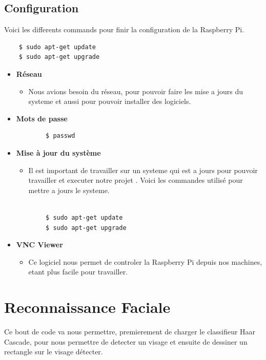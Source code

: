 \documentclass{article}
\begin{document}
\subsection{Configuration}
Voici les differents commands pour finir la configuration de la Raspberry Pi.
\begin{verbatim}
    $ sudo apt-get update
    $ sudo apt-get upgrade
\end{verbatim}
\begin{itemize}
    \item \textbf{Réseau}
    \begin{itemize}
        \item Nous avions besoin du réseau, pour pouvoir faire les mise a jours du systeme et aussi pour pouvoir installer des logiciels.
    \end{itemize}
    \item \textbf{Mots de passe}
    \begin{verbatim}
        $ passwd
    \end{verbatim}
    \item \textbf{Mise à jour du système}
    \begin{itemize}
        \item Il est important de travailler sur un systeme qui est a jours pour pouvoir travailler et executer notre projet
        . Voici les commandes utilisé pour mettre a jours le systeme.
    \end{itemize}
    \begin{verbatim}
        
        $ sudo apt-get update
        $ sudo apt-get upgrade
    \end{verbatim}
    
    \item \textbf{VNC Viewer}
    \begin{itemize}
        \item Ce logiciel nous permet de controler la Raspberry Pi depuis nos machines, etant plus facile pour travailler.
    \end{itemize}
\end{itemize}

\section{Reconnaissance Faciale}

Ce bout de code va nous permettre, premierement de charger le classifieur Haar Cascade, pour nous permettre de detecter un visage 
et ensuite de dessiner un rectangle sur le visage détecter.
\end{document}
